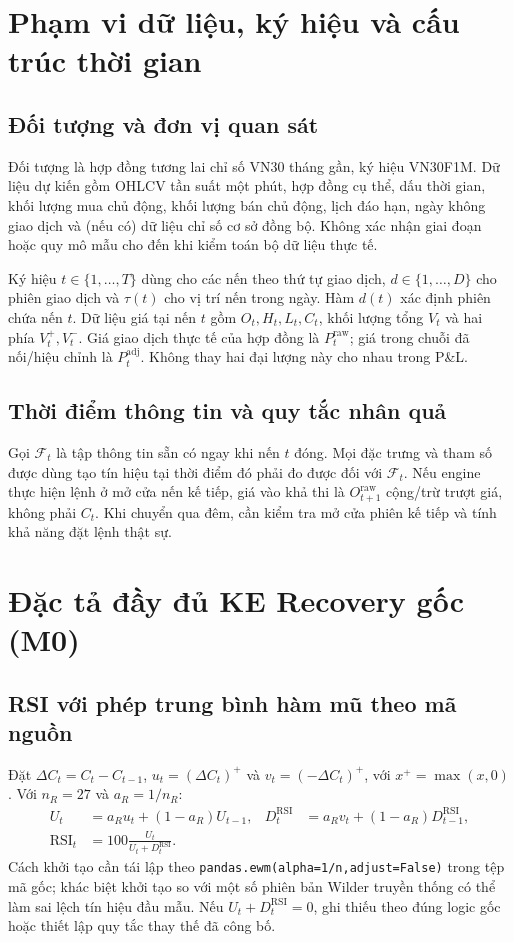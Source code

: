 \documentclass[12pt,a4paper,oneside]{article}
\newcommand{\RSI}{\operatorname{RSI}}
\begin{document}
\section{Phạm vi dữ liệu, ký hiệu và cấu trúc thời gian}
\subsection{Đối tượng và đơn vị quan sát}
Đối tượng là hợp đồng tương lai chỉ số VN30 tháng gần, ký hiệu VN30F1M. Dữ liệu dự kiến gồm OHLCV tần suất một phút, hợp đồng cụ thể, dấu thời gian, khối lượng mua chủ động, khối lượng bán chủ động, lịch đáo hạn, ngày không giao dịch và (nếu có) dữ liệu chỉ số cơ sở đồng bộ. Không xác nhận giai đoạn hoặc quy mô mẫu cho đến khi kiểm toán bộ dữ liệu thực tế.

Ký hiệu $t\in\{1,\ldots,T\}$ dùng cho các nến theo thứ tự giao dịch, $d\in\{1,\ldots,D\}$ cho phiên giao dịch và $\tau(t)$ cho vị trí nến trong ngày. Hàm $d(t)$ xác định phiên chứa nến $t$. Dữ liệu giá tại nến $t$ gồm $O_t,H_t,L_t,C_t$, khối lượng tổng $V_t$ và hai phía $V_t^+,V_t^-$. Giá giao dịch thực tế của hợp đồng là $P_t^{\mathrm{raw}}$; giá trong chuỗi đã nối/hiệu chỉnh là $P_t^{\mathrm{adj}}$. Không thay hai đại lượng này cho nhau trong P\&L.

\subsection{Thời điểm thông tin và quy tắc nhân quả}
Gọi $\mathcal F_t$ là tập thông tin sẵn có ngay khi nến $t$ đóng. Mọi đặc trưng và tham số được dùng tạo tín hiệu tại thời điểm đó phải đo được đối với $\mathcal F_t$. Nếu engine thực hiện lệnh ở mở cửa nến kế tiếp, giá vào khả thi là $O_{t+1}^{\mathrm{raw}}$ cộng/trừ trượt giá, không phải $C_t$. Khi chuyển qua đêm, cần kiểm tra mở cửa phiên kế tiếp và tính khả năng đặt lệnh thật sự.

\section{Đặc tả đầy đủ KE Recovery gốc (M0)}
\subsection{RSI với phép trung bình hàm mũ theo mã nguồn}
Đặt $\Delta C_t=C_t-C_{t-1}$, $u_t=(\Delta C_t)^+$ và $v_t=(-\Delta C_t)^+$, với $x^+=\max(x,0)$. Với $n_R=27$ và $a_R=1/n_R$:
\begin{align}
U_t&=a_R u_t+(1-a_R)U_{t-1},&D_t^{\mathrm{RSI}}&=a_R v_t+(1-a_R)D_{t-1}^{\mathrm{RSI}},\\
\RSI_t&=100\frac{U_t}{U_t+D_t^{\mathrm{RSI}}}.
\end{align}
Cách khởi tạo cần tái lập theo \texttt{pandas.ewm(alpha=1/n,adjust=False)} trong tệp mã gốc; khác biệt khởi tạo so với một số phiên bản Wilder truyền thống có thể làm sai lệch tín hiệu đầu mẫu. Nếu $U_t+D_t^{\mathrm{RSI}}=0$, ghi thiếu theo đúng logic gốc hoặc thiết lập quy tắc thay thế đã công bố.
\end{document}
